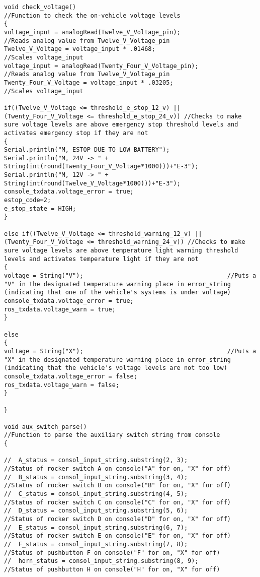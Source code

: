 \begin{lstlisting}[breaklines=true,basicstyle=\tiny]
void check_voltage()                                              //Function to check the on-vehicle voltage levels
{
voltage_input = analogRead(Twelve_V_Voltage_pin);               //Reads analog value from Twelve_V_Voltage_pin
Twelve_V_Voltage = voltage_input * .01468;                      //Scales voltage_input 
voltage_input = analogRead(Twenty_Four_V_Voltage_pin);          //Reads analog value from Twelve_V_Voltage_pin
Twenty_Four_V_Voltage = voltage_input * .03205;                 //Scales voltage_input 

if((Twelve_V_Voltage <= threshold_e_stop_12_v) || (Twenty_Four_V_Voltage <= threshold_e_stop_24_v)) //Checks to make sure voltage levels are above emergency stop threshold levels and activates emergency stop if they are not
{
Serial.println("M, ESTOP DUE TO LOW BATTERY");
Serial.println("M, 24V -> " + String(int(round(Twenty_Four_V_Voltage*1000)))+"E-3");
Serial.println("M, 12V -> " + String(int(round(Twelve_V_Voltage*1000)))+"E-3");
console_txdata.voltage_error = true;
estop_code=2;
e_stop_state = HIGH;
}

else if((Twelve_V_Voltage <= threshold_warning_12_v) || (Twenty_Four_V_Voltage <= threshold_warning_24_v)) //Checks to make sure voltage levels are above temperature light warning threshold levels and activates temperature light if they are not
{
voltage = String("V");                                        //Puts a "V" in the designated temperature warning place in error_string (indicating that one of the vehicle's systems is under voltage)
console_txdata.voltage_error = true;
ros_txdata.voltage_warn = true;
}

else
{
voltage = String("X");                                        //Puts a "X" in the designated temperature warning place in error_string (indicating that the vehicle's voltage levels are not too low)
console_txdata.voltage_error = false;
ros_txdata.voltage_warn = false;
}

}

void aux_switch_parse()                                           //Function to parse the auxiliary switch string from console
{

//  A_status = consol_input_string.substring(2, 3);                 //Status of rocker switch A on console("A" for on, "X" for off)
//  B_status = consol_input_string.substring(3, 4);                 //Status of rocker switch B on console("B" for on, "X" for off)
//  C_status = consol_input_string.substring(4, 5);                 //Status of rocker switch C on console("C" for on, "X" for off)
//  D_status = consol_input_string.substring(5, 6);                 //Status of rocker switch D on console("D" for on, "X" for off)
//  E_status = consol_input_string.substring(6, 7);                 //Status of rocker switch E on console("E" for on, "X" for off)
//  F_status = consol_input_string.substring(7, 8);                 //Status of pushbutton F on console("F" for on, "X" for off)
//  horn_status = consol_input_string.substring(8, 9);              //Status of pushbutton H on console("H" for on, "X" for off)


\end{lstlisting}

